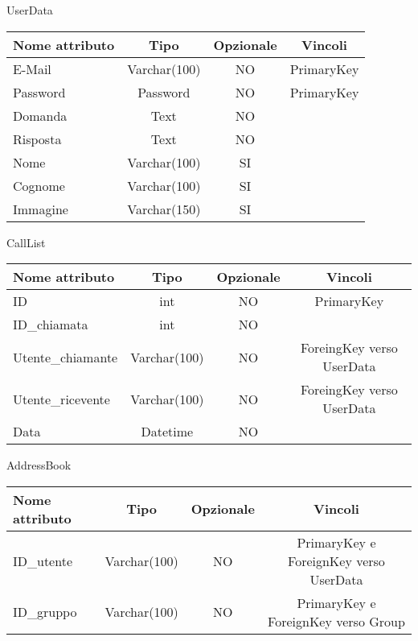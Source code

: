 \begin{center}

UserData

\begin{center}
\begin{tabular}{lccc}
\toprule
Nome attributo & Tipo & Opzionale & Vincoli\\
\midrule %
E-Mail & Varchar(100) & NO & PrimaryKey\\
Password & Password & NO & PrimaryKey\\
Domanda & Text & NO &\\
Risposta & Text & NO &\\
Nome & Varchar(100) & SI &\\
Cognome & Varchar(100) & SI &\\
Immagine & Varchar(150) & SI &\\
\bottomrule
\end{tabular}
\end{center}

CallList

\begin{center}
\begin{tabular}{lccc}
\toprule
Nome attributo & Tipo & Opzionale & Vincoli\\
\midrule %
ID & int & NO & PrimaryKey\\
ID\_chiamata & int & NO & \\
Utente\_chiamante & Varchar(100) & NO & ForeingKey verso UserData\\
Utente\_ricevente & Varchar(100) & NO & ForeingKey verso UserData\\
Data & Datetime & NO &\\
\bottomrule
\end{tabular}
\end{center}

AddressBook

\begin{center}
\begin{tabular}{lccc}
\toprule
Nome attributo & Tipo & Opzionale & Vincoli\\
\midrule %
ID\_utente & Varchar(100) & NO & PrimaryKey e ForeignKey verso UserData\\
ID\_gruppo & Varchar(100) & NO & PrimaryKey e ForeignKey verso Group\\
\bottomrule
\end{tabular}
\end{center}


\end{center}
